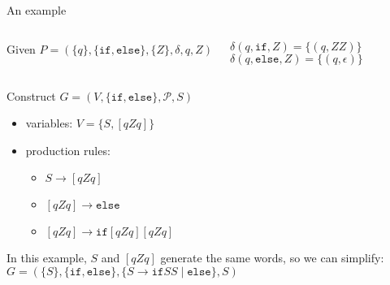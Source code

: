 \documentclass[handout]{beamer}
\begin{document}
\begin{frame}{An example}

    \begin{columns}

        \centering
        
        Given $P=(\{q\},\{\mathtt{if},\mathtt{else}\},\{Z\},\delta,q,Z)$
        
        \smallskip

        $\delta(q,\mathtt{if},Z)=\{(q,ZZ)\}$\\        
        $\delta(q,\mathtt{else},Z)=\{(q,\epsilon)\}$
        

        \begin{center}
        \end{center} 

    \end{columns}

    Construct $G=(V,\{\mathtt{if},\mathtt{else}\},\mathcal P,S)$

    \begin{itemize}
        \item variables: $V=\{S,[qZq]\}$ 
        \item production rules:
        \begin{itemize}
            \item $S\rightarrow [qZq]$            
            \item $[qZq]\rightarrow \mathtt{else}$
            \item $[qZq]\rightarrow \mathtt{if}[qZq][qZq]$
            
        \end{itemize}        
    \end{itemize}    
    
    In this example, $S$ and $[qZq]$ generate the same words, so we can simplify:
         $G=(\{S\},\{\mathtt{if},\mathtt{else}\},\{S\rightarrow \mathtt{if}SS\mid\mathtt{else}\},S)$
    
\end{frame}
\end{document}
